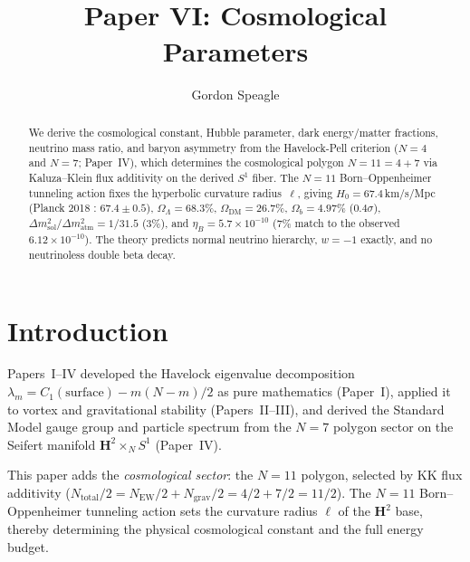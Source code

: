 








\title{\seriestitle\\[6pt]\large Paper VI: Cosmological Parameters}
\author{Gordon Speagle}
\date{}


\maketitle

\begin{abstract}
We derive the cosmological constant, Hubble parameter, dark
energy/matter fractions, neutrino mass ratio, and baryon
asymmetry from the Havelock-Pell criterion
($N = 4$ and $N = 7$; Paper~IV), which determines
the cosmological polygon $N = 11 = 4 + 7$ via
Kaluza--Klein flux additivity on the derived $S^1$ fiber.
The $N = 11$ Born--Oppenheimer tunneling action fixes the
hyperbolic curvature radius~$\ell$, giving
$H_0 = 67.4$\,km/s/Mpc (Planck 2018 \citep{Planck2018}: $67.4 \pm 0.5$),
$\Omega_\Lambda = 68.3\%$,
$\Omega_{\mathrm{DM}} = 26.7\%$,
$\Omega_b = 4.97\%$ ($0.4\sigma$),
$\Delta m^2_{\mathrm{sol}}/\Delta m^2_{\mathrm{atm}} = 1/31.5$ ($3\%$),
and $\eta_B = 5.7 \times 10^{-10}$
($7\%$ match to the observed
$6.12 \times 10^{-10}$).
The theory predicts normal neutrino hierarchy,
$w = -1$ exactly, and no neutrinoless double beta decay.
\end{abstract}

\section{Introduction}
\label{sec:intro-cosmo}

Papers~I--IV developed the Havelock eigenvalue decomposition
$\lambda_m = C_1(\text{surface}) - m(N{-}m)/2$
as pure mathematics (Paper~I), applied it to vortex and
gravitational stability (Papers~II--III), and derived the
Standard Model gauge group and particle spectrum from the
$N = 7$ polygon sector on the Seifert manifold
$\mathbf{H}^2 \times_N S^1$ (Paper~IV).

This paper adds the \emph{cosmological sector}: the $N = 11$
polygon, selected by KK flux additivity
($N_{\mathrm{total}}/2 = N_{\mathrm{EW}}/2 + N_{\mathrm{grav}}/2
= 4/2 + 7/2 = 11/2$).
The $N = 11$ Born--Oppenheimer tunneling action sets the
curvature radius $\ell$ of the $\mathbf{H}^2$ base, thereby
determining the physical cosmological constant and the full
energy budget.

